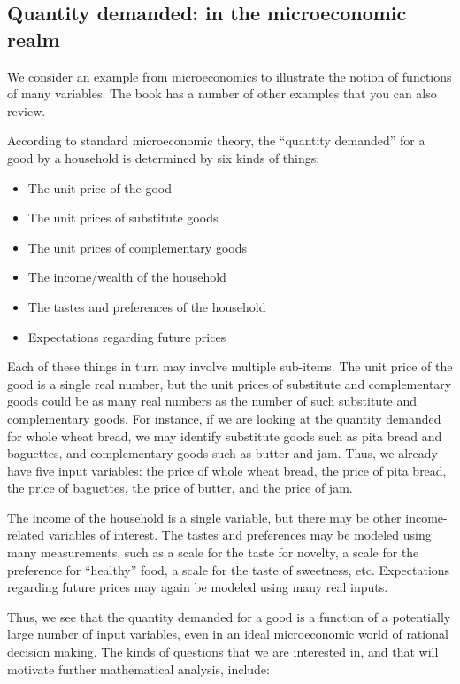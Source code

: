 \documentclass[10pt]{amsart}
\begin{document}
\subsection{Quantity demanded: in the microeconomic realm}

We consider an example from microeconomics to illustrate the notion of
functions of many variables. The book has a number of other examples
that you can also review.

According to standard microeconomic theory, the ``quantity demanded''
for a good by a household is determined by six kinds of things:

\begin{itemize}
\item The unit price of the good
\item The unit prices of substitute goods
\item The unit prices of complementary goods
\item The income/wealth of the household
\item The tastes and preferences of the household
\item Expectations regarding future prices
\end{itemize}

Each of these things in turn may involve multiple sub-items. The unit
price of the good is a single real number, but the unit prices of
substitute and complementary goods could be as many real numbers as
the number of such substitute and complementary goods. For instance,
if we are looking at the quantity demanded for whole wheat bread, we
may identify substitute goods such as pita bread and baguettes, and
complementary goods such as butter and jam. Thus, we already have five
input variables: the price of whole wheat bread, the price of pita
bread, the price of baguettes, the price of butter, and the price of
jam.

The income of the household is a single variable, but there may be
other income-related variables of interest. The tastes and preferences
may be modeled using many measurements, such as a scale for the taste
for novelty, a scale for the preference for ``healthy'' food, a scale
for the taste of sweetness, etc. Expectations regarding future prices
may again be modeled using many real inputs.

Thus, we see that the quantity demanded for a good is a function of a
potentially large number of input variables, even in an ideal
microeconomic world of rational decision making. The kinds of
questions that we are interested in, and that will motivate further
mathematical analysis, include:
\end{document}
